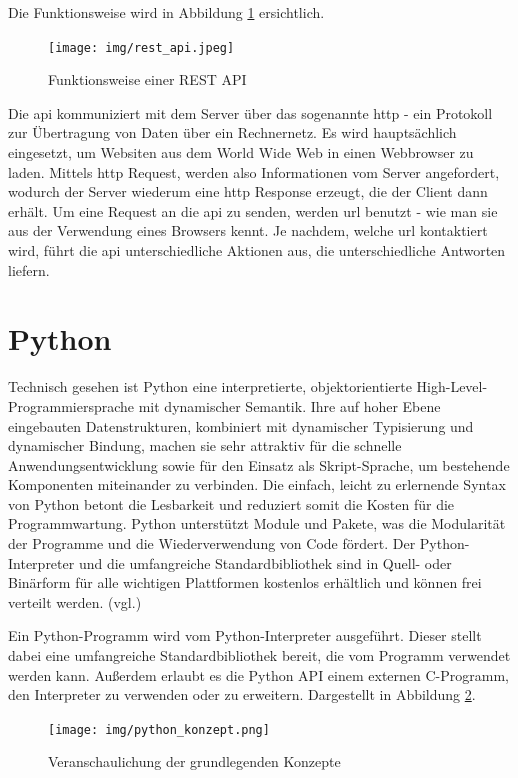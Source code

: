 \documentclass[oneside]{ausarbeitung}
\begin{document}
Die Funktionsweise wird in Abbildung \ref{fig:5} ersichtlich.

\begin{figure}[H]
  \centering
  \texttt{[image: img/rest\_api.jpeg]}
  \caption{Funktionsweise einer REST API\cite{rest_pic}}
  \label{fig:5}
\end{figure}

Die \ac{api} kommuniziert mit dem Server über das sogenannte
\ac{http} - ein Protokoll zur Übertragung von Daten über ein
Rechnernetz. Es wird hauptsächlich eingesetzt, um Websiten aus dem
World Wide Web in einen Webbrowser zu laden\cite{http_definition}.
Mittels \ac{http} Request, werden also Informationen vom Server
angefordert, wodurch der Server wiederum eine \ac{http} Response
erzeugt, die der Client dann erhält. Um eine Request an die
\ac{api} zu senden, werden \ac{url} benutzt - wie man sie aus der 
Verwendung eines Browsers kennt. Je nachdem, welche \ac{url} kontaktiert
wird, führt die \ac{api} unterschiedliche Aktionen aus, die 
unterschiedliche Antworten liefern.

\section{Python}
\label{sec:python}

Technisch gesehen ist Python eine interpretierte, objektorientierte
High-Level-Programmiersprache mit dynamischer Semantik. Ihre auf hoher
Ebene eingebauten Datenstrukturen, kombiniert mit dynamischer
Typisierung und dynamischer Bindung, machen sie sehr attraktiv für
die schnelle Anwendungsentwicklung sowie für den Einsatz als
Skript-Sprache, um bestehende Komponenten miteinander zu verbinden.
Die einfach, leicht zu erlernende Syntax von Python betont die
Lesbarkeit und reduziert somit die Kosten für die Programmwartung.
Python unterstützt Module und Pakete, was die Modularität der
Programme und die Wiederverwendung von Code fördert. Der
Python-Interpreter und die umfangreiche Standardbibliothek sind in
Quell- oder Binärform für alle wichtigen Plattformen kostenlos
erhältlich und können frei verteilt werden. 
(vgl.\cite{python_definition})

Ein Python-Programm wird vom Python-Interpreter ausgeführt. Dieser
stellt dabei eine umfangreiche Standardbibliothek bereit, die vom
Programm verwendet werden kann. Außerdem erlaubt es die Python API
einem externen C-Programm, den Interpreter zu verwenden oder zu
erweitern. Dargestellt in Abbildung \ref{fig:6}.

\begin{figure}[H]
  \centering
  \texttt{[image: img/python\_konzept.png]}
  \caption{Veranschaulichung der grundlegenden Konzepte\cite{python_konzepte}}
  \label{fig:6}
\end{figure}
\end{document}

